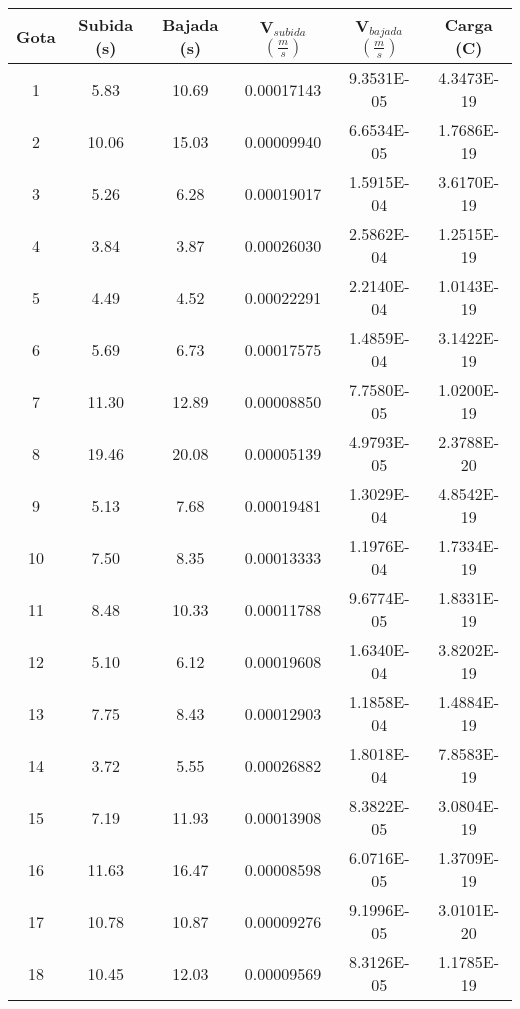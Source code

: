 \documentclass{article}
\begin{document}
\begin{enumerate}
\begin{table}[h!]
    \centering
    \begin{tabular}{|c|c|c|c|c|c|}
    \hline
       Gota  & Subida (s) & Bajada (s) & V$_{subida}$ $(\frac{m}{s})$ & V$_{bajada}$ $(\frac{m}{s})$& Carga (C)\\ 
       \hline
       1  & 5.83 & 10.69 & 0.00017143 & 9.3531E-05 & 4.3473E-19 \\ 
       \hline
       2  & 10.06 & 15.03 & 0.00009940 & 6.6534E-05 & 1.7686E-19 \\
       \hline
       3  & 5.26 & 6.28 & 0.00019017 & 1.5915E-04 & 3.6170E-19 \\
       \hline
       4  & 3.84 & 3.87 & 0.00026030 & 2.5862E-04 & 1.2515E-19 \\       
       \hline
       5  & 4.49 & 4.52 & 0.00022291 & 2.2140E-04 & 1.0143E-19 \\       
       \hline
       6  & 5.69 & 6.73 & 0.00017575 & 1.4859E-04 & 3.1422E-19 \\       
       \hline
       7  & 11.30 & 12.89 & 0.00008850 & 7.7580E-05 & 1.0200E-19 \\       
       \hline
       8  & 19.46 & 20.08 & 0.00005139 & 4.9793E-05 & 2.3788E-20 \\       
       \hline
       9  & 5.13 & 7.68 & 0.00019481 & 1.3029E-04 & 4.8542E-19 \\       
       \hline
       10  & 7.50 & 8.35 & 0.00013333 & 1.1976E-04 & 1.7334E-19 \\   
       \hline
       11  & 8.48 & 10.33 & 0.00011788 & 9.6774E-05 & 1.8331E-19 \\        
       \hline
       12  & 5.10 & 6.12 & 0.00019608 & 1.6340E-04 & 3.8202E-19 \\        
       \hline
       13  & 7.75 & 8.43 & 0.00012903 & 1.1858E-04 & 1.4884E-19 \\        
       \hline
       14  & 3.72 & 5.55 & 0.00026882 & 1.8018E-04 & 7.8583E-19 \\        
       \hline
       15  & 7.19 & 11.93 & 0.00013908 & 8.3822E-05 & 3.0804E-19 \\        
       \hline
       16  & 11.63 & 16.47 & 0.00008598 & 6.0716E-05 & 1.3709E-19 \\        
       \hline
       17  & 10.78 & 10.87 & 0.00009276 & 9.1996E-05 & 3.0101E-20 \\ 
       \hline
       18  & 10.45 & 12.03 & 0.00009569 & 8.3126E-05 & 1.1785E-19 \\        

\end{tabular}
\end{table}
\end{enumerate}
\end{document}
